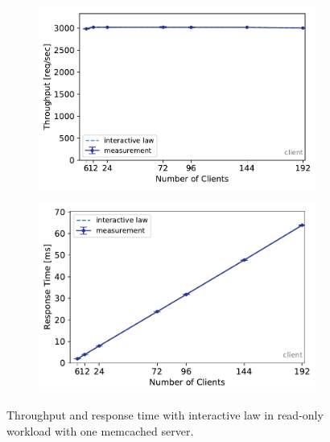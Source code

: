 \documentclass[report.tex]{subfiles}
\begin{document}
\begin{figure}
	\begin{subfigure}[b]{.49\linewidth}
		\centering
		\includegraphics[width=\linewidth]{data/exp21_ro_tp_nc.pdf}
	\end{subfigure}\hfill
	\begin{subfigure}[b]{.49\linewidth}
		\centering
		\includegraphics[width=\linewidth]{data/exp21_ro_rt_nc.pdf}
	\end{subfigure}%
	\caption{Throughput and response time with interactive law in read-only workload with one memcached server.}
	\label{exp21_ro_nc}
\end{figure}
\end{document}
